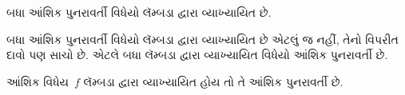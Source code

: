 \begin{thm}
  બધા આંશિક પુનરાવર્તી વિધેયો લૅમ્બડા દ્વારા વ્યાખ્યાયિત છે.
\end{thm}
\endgroup

\begingroup
\makeatletter{}\makeatother

\label{guunit:OLP-0382}


બધા આંશિક પુનરાવર્તી વિધેયો લૅમ્બડા દ્વારા વ્યાખ્યાયિત
છે એટલું જ નહીં, તેનો વિપરીત દાવો પણ સાચો છે.
એટલે બધા લૅમ્બડા દ્વારા વ્યાખ્યાયિત વિધેયો આંશિક
પુનરાવર્તી છે.

\begin{thm}
   આંશિક વિધેય~$f$
  લૅમ્બડા દ્વારા વ્યાખ્યાયિત હોય તો તે આંશિક પુનરાવર્તી છે.
\end{thm}


